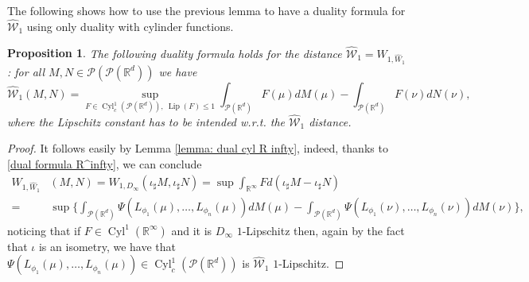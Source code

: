 \documentclass[10pt,leqno]{amsart}
\numberwithin{equation}{section}
\newtheorem{prop}[teorema]{Proposition}
\newcommand{\R}{\mathbb{R}}
\newcommand{\PP}{\mathcal{P}}
\begin{document}
The following shows how to use the previous lemma to have a duality formula for $\hat{\mathcal{W}}_1$ using only duality with cylinder functions.

\begin{prop}\label{prop dual cyl}
    The following duality formula holds for the distance $\hat{\mathcal{W}}_1 = W_{1,\hat{W}_1}$: for all $M,N\in \PP(\PP(\R^d))$ we have 
    \begin{equation}
        \hat{\mathcal{W}}_1
        (M,N) = \sup_{F\in \operatorname{Cyl}_c^1(\PP(\R^d)), \ \operatorname{Lip}(F)\leq 1 } \int_{\PP(\R^d)} F(\mu) dM(\mu) - \int_{\PP(\R^d)}F(\nu) dN(\nu), 
    \end{equation} 
    where the Lipschitz constant has to be intended w.r.t. the $\hat{\mathcal{W}}_1$ distance.
\end{prop}



\begin{proof}
    It follows easily by Lemma \ref{lemma: dual cyl R infty}, indeed, thanks to \eqref{dual formula R^infty}, we can conclude
    \begin{align*}
        W_{1,\hat{W}_1}&(M,N) =  W_{1,D_\infty}(\iota_{\sharp }M,\iota_\sharp  N)
        =  \sup \int_{\R^\infty} F d(\iota_\sharp M - \iota_\sharp N) 
        \\
        = & \sup \bigg\{\int_{\PP(\R^d)} \Psi(L_{\phi_1}(\mu),\dots,L_{\phi_n}(\mu)) dM(\mu) 
        - \int_{\PP(\R^d)} \Psi(L_{\phi_1}(\nu),\dots,L_{\phi_n}(\nu)) dM(\nu)\bigg\},
    \end{align*}
    noticing that if $F\in\operatorname{Cyl}^1(\R^\infty)$ and it is $D_\infty$ $1$-Lipschitz then, again by the fact that $\iota$ is an isometry, we have that $\Psi(L_{\phi_1}(\mu),\dots,L_{\phi_n}(\mu)) \in \operatorname{Cyl}_c^1(\PP(\R^d))$ is $\hat{\mathcal{W}}_1$ $1$-Lipschitz.
\end{proof}
\end{document}
